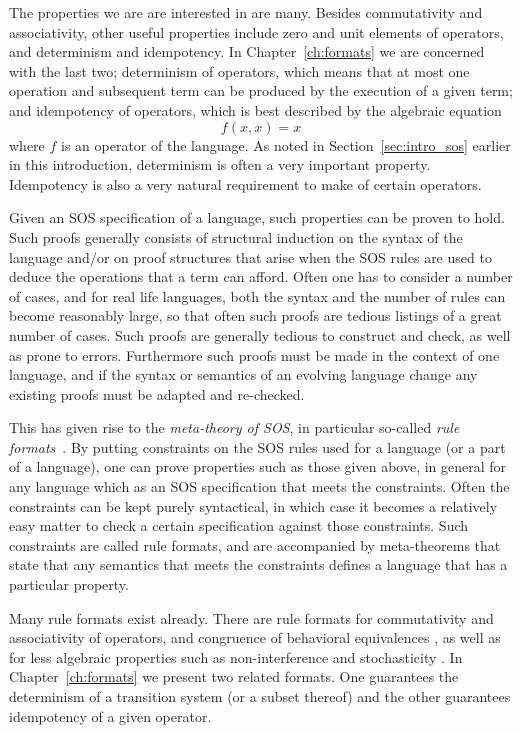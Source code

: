 The properties we are are interested in are many. Besides commutativity and
associativity, other useful properties include zero and
unit elements of operators, and determinism and idempotency. In Chapter~\ref{ch:formats}
we are concerned with the last two; determinism of operators, which means that
at most one operation and subsequent term can be produced by the execution of
a given term; and idempotency of operators, which is best described by the algebraic
equation
\[
    f(x,x) = x
\]
where $f$ is an operator of the language. As noted in Section~\ref{sec:intro_sos}
earlier in this introduction, determinism is often a very important property.
Idempotency is also a very natural requirement to make of certain operators.

Given an SOS specification of a language, such properties can be proven to hold.
Such proofs generally consists of structural induction on the syntax of the language
and/or on proof structures that arise when the SOS rules are used to deduce the
operations that a term can afford. Often one has to consider a number of cases,
and for real life languages, both the syntax and the number of rules can become
reasonably large, so that often such proofs are tedious listings of a great
number of cases. Such proofs are generally tedious to construct and check, as well
as prone to errors. Furthermore such proofs must be made in the context of one
language, and if the syntax or semantics of an evolving language change any existing
proofs must be adapted and re-checked.

This has given rise to the \emph{meta-theory of SOS}, in particular so-called
\emph{rule formats}~\cite{Aceto01,Mousavi07-TCS}. By putting constraints on the
SOS rules used for a language (or a part of a language), one can prove properties
such as those given above, in general for any language which as an SOS specification that
meets the constraints. Often the constraints can be kept purely syntactical, in
which case it becomes a relatively easy matter to check a certain specification
against those constraints. Such constraints are called rule formats, and are
accompanied by meta-theorems that state that any semantics that meets the constraints
defines a language that has a particular property.

Many rule formats exist already. There are rule formats for 
commutativity \cite{Mousavi05-IPL} and 
associativity \cite{Mousavi08-CONCUR} of operators, and congruence of behavioral 
equivalences \cite{Verhoef95}, as well as for less algebraic properties such
as non-interference \cite{Tini04} and stochasticity \cite{Lanotte05}.
%
In Chapter~\ref{ch:formats} we present two related formats. 
One guarantees the determinism of a transition system (or a subset thereof) 
and the other guarantees idempotency of a given operator.

